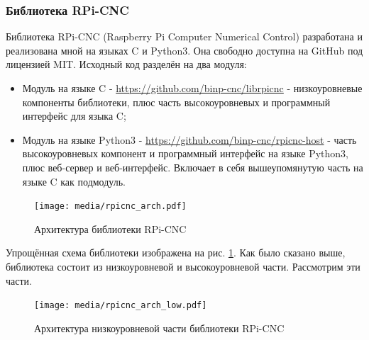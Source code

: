 \documentclass[14pt,russian,a4paper]{extarticle}
\newcounter{subsubsubsection}[subsubsection]
\begin{document}
\subsubsection{Библиотека RPi-CNC}
Библиотека RPi-CNC (Raspberry Pi Computer Numerical Control) разработана и реализована мной на языках C и Python3. Она свободно доступна на GitHub под лицензией MIT. Исходный код разделён на два модуля:
\begin{itemize}
    \item Модуль на языке C - \url{https://github.com/binp-cnc/librpicnc} - низкоуровневые компоненты библиотеки, плюс часть высокоуровневых и программный интерфейс для языка C;
    \item Модуль на языке Python3 - \url{https://github.com/binp-cnc/rpicnc-host} - часть высокоуровневых компонент и программный интерфейс на языке Python3, плюс веб-сервер и веб-интерфейс. Включает в себя вышеупомянутую часть на языке C как подмодуль.
\end{itemize}


\begin{figure}[h!]
    \centerline{\texttt{[image: media/rpicnc\_arch.pdf]}}
    \caption{Архитектура библиотеки RPi-CNC}
    \label{fig:rpicnc_arch}
\end{figure}

Упрощённая схема библиотеки изображена на рис. \ref{fig:rpicnc_arch}.
Как было сказано выше, библиотека состоит из низкоуровневой и высокоуровневой части. Рассмотрим эти части.


\begin{figure}[h!]
    \centerline{\texttt{[image: media/rpicnc\_arch\_low.pdf]}}
    \caption{Архитектура низкоуровневой части библиотеки RPi-CNC}
    \label{fig:rpicnc_arch_low}
\end{figure}
\end{document}
